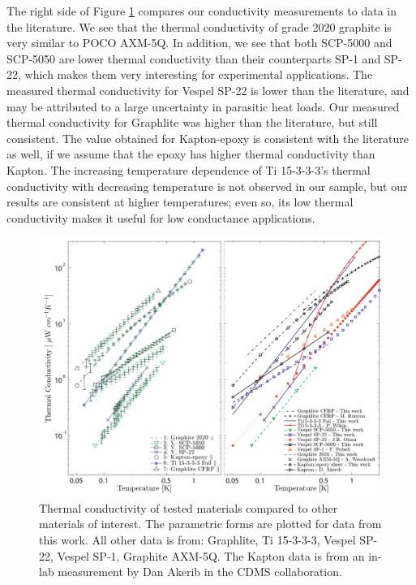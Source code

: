 \documentclass[final]{svjour2}
\begin{document}
The right side of Figure \ref{plots} compares our conductivity measurements to data in the literature. We see that the thermal conductivity of grade 2020 graphite is very similar to POCO AXM-5Q. In addition, we see that both SCP-5000 and SCP-5050 are lower thermal conductivity than their counterparts SP-1 and SP-22, which makes them very interesting for experimental applications. The measured thermal conductivity for Vespel SP-22 is lower than the literature, and may be attributed to a large uncertainty in parasitic heat loads. Our measured thermal conductivity for Graphlite was higher than the literature, but still consistent. The value obtained for Kapton-epoxy is consistent with the literature as well, if we assume that the epoxy has higher thermal conductivity than Kapton. The increasing temperature dependence of Ti 15-3-3-3's thermal conductivity with decreasing temperature is not observed in our sample, but our results are consistent at higher temperatures; even so, its low thermal conductivity makes it useful for low conductance applications.

\begin{figure}[h]
\includegraphics[width = \textwidth]{Double_plot_v2.png}
\caption{{\small Thermal conductivity of tested materials compared to other materials of interest. The parametric forms are plotted for data from this work. All other data is from: Graphlite\cite{Runyan2008}, Ti 15-3-3-3\cite{Wikus2010}, Vespel SP-22\cite{Olson1993}, Vespel SP-1\cite{Pobell1992}, Graphite AXM-5Q\cite{Woodcraft2009}. The Kapton data is from an in-lab measurement by Dan Akerib in the CDMS collaboration.}}
\label{plots}
\end{figure}
\end{document}

